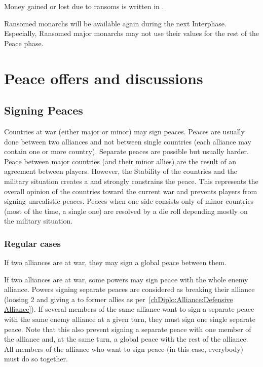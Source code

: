 \aparag Money gained or lost due to ransoms is written in .

\bparag Ransomed monarchs will be available again during the next Interphase.
\bparag Especially, Ransomed major monarchs may not use their values for the
rest of the Peace phase.

\section{Peace offers and discussions}\label{chPeace:Peace offers}
\subsection{Signing Peaces}
Countries at war (either major or minor) may sign peaces. Peaces are usually
done between two alliances and not between single countries (each alliance may
contain one or more country). Separate peaces are possible but usually
harder. Peace between major countries (and their minor allies) are the result
of an agreement between players. However, the Stability of the countries and
the military situation creates a  and strongly
constrains the peace. This represents the overall opinion of the countries
toward the current war and prevents players from signing unrealistic
peaces. Peaces when one side consists only of minor countries (most of the
time, a single one) are resolved by a die roll depending mostly on the
military situation.

\subsubsection{Regular cases}
 If two alliances are at war, they may sign a global
peace between them.

 If two alliances are at war, some
powers may sign peace with the whole enemy alliance.
\bparag Powers signing separate peaces are considered as breaking their
alliance (loosing 2 \STAB and giving a \CB to former allies as
per~\ref{chDiplo:Alliance:Defensive Alliance}).
\bparag If several members of the same alliance want to sign a separate peace
with the same enemy alliance at a given turn, they must sign one single
separate peace.
\bparag Note that this also prevent signing a separate peace with one member
of the alliance and, at the same turn, a global peace with the rest of the
alliance. All members of the alliance who want to sign peace (in this case,
everybody) must do so together.

